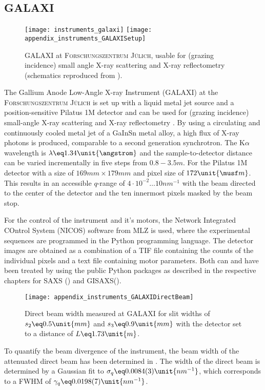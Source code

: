 \documentclass[\main/dresen_thesis.tex]{subfiles}
\begin{document}
  \subsection{GALAXI}\label{ch:lss:galaxi}
    \begin{figure}[ht]
      \centering
      \texttt{[image: instruments\_galaxi]}
      \texttt{[image: appendix\_instruments\_GALAXISetup]}
      \caption{\label{fig:lss:galaxi}GALAXI at \textsc{Forschungszentrum J\"ulich}, usable for (grazing incidence) small angle X-ray scattering and X-ray reflectometry (schematics reproduced from \cite{FZJ_2016_GALAX}).}
    \end{figure}

    The Gallium Anode Low-Angle X-ray Instrument (GALAXI) at the \textsc{Forschungszentrum J\"ulich} is set up with a liquid metal jet source and a position-sensitive Pilatus 1M detector and can be used for (grazing incidence) small-angle X-ray scattering and X-ray reflectometry \cite{FZJ_2016_GALAX}.
    By using a circulating and continuously cooled metal jet of a GaInSn metal alloy, a high flux of X-ray photons is produced, comparable to a second generation synchrotron.
    The K$\alpha$ wavelength is $\lambda \eq 1.34 \unit{\angstrom}$ and the sample-to-detector distance can be varied incrementally in five steps from $0.8 - 3.5 \unit{m}$.
    For the Pilatus 1M detector with a size of $169 \unit{mm} \times 179 \unit{mm}$ and pixel size of $172 \unit{\musf m}$.
    This results in an accessible $q$-range of $4 \cdot 10^{-2} \ldots 10 \unit{nm}^{-1}$ with the beam directed to the center of the detector and the ten innermost pixels masked by the beam stop.

    For the control of the instrument and it's motors, the Network Integrated COntrol System (NICOS) software from MLZ is used, where the experimental sequences are programmed in the Python programming language. 
    The detector images are obtained as a combination of a TIF file containing the counts of the individual pixels and a text file containing motor parameters.
    Both can and have been treated by using the public Python packages as described in the respective chapters for SAXS () and GISAXS().

    \begin{figure}[ht]
      \centering
      \texttt{[image: appendix\_instruments\_GALAXIDirectBeam]}
      \caption{\label{fig:lss:galaxi:directBeam}Direct beam width measured at GALAXI for slit widths of $s_2 \eq 0.5 \unit{mm}$ and $s_3 \eq 0.9 \unit{mm}$ with the detector set to a distance of $L \eq 1.73 \unit{m}$.}
    \end{figure}
    To quantify the beam divergence of the instrument, the beam width of the attenuated direct beam has been determined in .
    The width of the direct beam is determined by a Gaussian fit to $\sigma_q \eq 0.0084(3) \unit{nm^{-1}}$, which corresponds to a FWHM of $\gamma_q \eq 0.0198(7) \unit{nm^{-1}}$.
\end{document}
